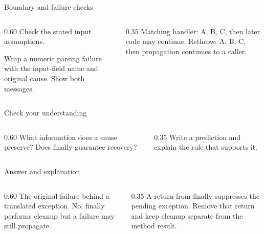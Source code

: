 \documentclass[10pt,aspectratio=169]{beamer}
\begin{document}
\begin{frame}[fragile,t]{Boundary and failure checks}
\begin{columns}[T,onlytextwidth]\begin{column}{0.60\textwidth}
Check the stated input assumptions.

Wrap a numeric parsing failure with the input-field name and original cause. Show both messages.
\end{column}\begin{column}{0.35\textwidth}\small
Matching handler: A, B, C, then later code may continue. Rethrow: A, B, C, then propagation continues to a caller.
\end{column}\end{columns}
\end{frame}

\begin{frame}[fragile,t]{Check your understanding}
\begin{columns}[T,onlytextwidth]\begin{column}{0.60\textwidth}
What information does a cause preserve? Does finally guarantee recovery?
\end{column}\begin{column}{0.35\textwidth}\small
Write a prediction and explain the rule that supports it.
\end{column}\end{columns}
\end{frame}

\begin{frame}[fragile,t]{Answer and explanation}
\begin{columns}[T,onlytextwidth]\begin{column}{0.60\textwidth}
The original failure behind a translated exception. No, finally performs cleanup but a failure may still propagate.
\end{column}\begin{column}{0.35\textwidth}\small
A return from finally suppresses the pending exception. Remove that return and keep cleanup separate from the method result.
\end{column}\end{columns}
\end{frame}
\end{document}
